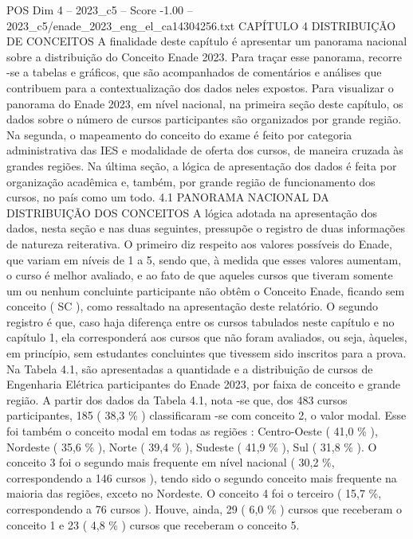 \begin{textsample}{POS Dim 4 – 2023\_c5 – Score -1.00 – 2023\_c5/enade\_2023\_eng\_el\_ca14304256.txt}  \label{ex:f4_pos_274}
CAPÍTULO 4 DISTRIBUIÇÃO DE CONCEITOS A finalidade deste capítulo é apresentar um panorama nacional sobre a distribuição do Conceito Enade 2023.
Para traçar esse panorama, recorre -se a tabelas e gráficos, que são acompanhados de comentários e análises que contribuem para a contextualização dos dados neles expostos.
Para visualizar o panorama do Enade 2023, em nível nacional, na primeira seção deste capítulo, os dados sobre o número de cursos participantes são organizados por grande região.
Na segunda, o mapeamento do conceito do exame é feito por categoria administrativa das IES e modalidade de oferta dos cursos, de maneira cruzada às grandes regiões.
Na última seção, a lógica de apresentação dos dados é feita por organização acadêmica e, também, por grande região de funcionamento dos cursos, no país como um todo. 4.1 PANORAMA NACIONAL DA DISTRIBUIÇÃO DOS CONCEITOS A lógica adotada na apresentação dos dados, nesta seção e nas duas seguintes, pressupõe o registro de duas informações de natureza reiterativa.
O primeiro diz respeito aos valores possíveis do Enade, que variam em níveis de 1 a 5, sendo que, à medida que esses valores aumentam, o curso é melhor avaliado, e ao fato de que aqueles cursos que tiveram somente um ou nenhum concluinte participante não obtêm o Conceito Enade, ficando sem conceito ( SC ), como ressaltado na apresentação deste relatório.
O segundo registro é que, caso haja diferença entre os cursos tabulados neste capítulo e no capítulo 1, ela corresponderá aos cursos que não foram avaliados, ou seja, àqueles, em princípio, sem estudantes concluintes que tivessem sido inscritos para a prova.
Na Tabela 4.1, são apresentadas a quantidade e a distribuição de cursos de Engenharia Elétrica participantes do Enade 2023, por faixa de conceito e grande região.
A partir dos dados da Tabela 4.1, nota -se que, dos 483 cursos participantes, 185 ( 38,3 \% ) classificaram -se com conceito 2, o valor modal.
Esse foi também o conceito modal em todas as regiões : Centro-Oeste ( 41,0 \% ), Nordeste ( 35,6 \% ), Norte ( 39,4 \% ), Sudeste ( 41,9 \% ), Sul ( 31,8 \% ).
O conceito 3 foi o segundo mais frequente em nível nacional ( 30,2 \%, correspondendo a 146 cursos ), tendo sido o segundo conceito mais frequente na maioria das regiões, exceto no Nordeste.
O conceito 4 foi o terceiro ( 15,7 \%, correspondendo a 76 cursos ).
Houve, ainda, 29 ( 6,0 \% ) cursos que receberam o conceito 1 e 23 ( 4,8 \% ) cursos que receberam o conceito 5.

\end{textsample}

